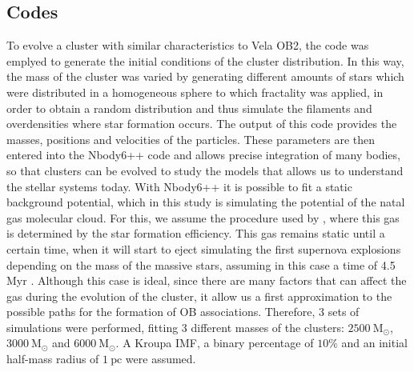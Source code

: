 \documentclass[baaa]{baaa}
\begin{document}
\subsection{Codes}
To evolve a cluster with similar characteristics to Vela OB2, the {} \citep{mcluster} code was emplyed to generate the initial conditions of the cluster
distribution. In this way, the mass of the cluster was varied by generating different amounts of stars which were distributed in a homogeneous sphere to which fractality was applied, in order to obtain a random distribution and thus simulate the filaments and overdensities where star formation occurs. The output of this code provides the masses, positions and velocities of the particles.
These parameters are then entered into the Nbody6++ code \citep{nbody6} and allows precise integration of many bodies, so that clusters can be evolved to study the models that allows us to understand the stellar systems today.
With Nbody6++ it is possible to fit a static background potential, which in this study is simulating the potential of the natal gas molecular cloud. For this, we assume the procedure used by \cite{farias}, where this gas is determined by the star formation efficiency. This gas remains static until a certain time, when it will start to eject simulating the first supernova explosions depending on the mass of the massive stars, assuming in this case a time of 4.5 Myr . Although this case is ideal, since there are many factors that can affect the gas during the evolution of the cluster, it allow us a first approximation to the possible paths for the formation of OB associations.
Therefore, 3 sets of simulations were performed, fitting 3 different masses of the clusters: $2500~\mathrm{M_{\odot}}$, $3000~\mathrm{M_{\odot}}$ and $6000~\mathrm{M_{\odot}}$. A Kroupa IMF, a binary percentage of $10 \%$ and an initial half-mass radius of $1~\mathrm{pc}$ were assumed.
\end{document}
